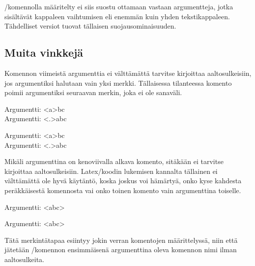 \-/komennolla määritelty  ei siis suostu ottamaan vastaan argumentteja, jotka
sisältävät kappaleen vaihtumisen eli enemmän kuin yhden tekstikappaleen.
Tähdelliset versiot tuovat tällaisen suo\-jaus\-omi\-nai\-suu\-den.

\subsection{Muita vinkkejä}
\label{luku:komennot-lisä}

Komennon viimeistä argumenttia ei välttämättä tarvitse kirjoittaa
aaltosulkeisiin, jos argumentiksi halutaan vain yksi merkki. Tällaisessa
tilanteessa komento poimii argumentiksi seuraavan merkin, joka ei ole
sanaväli.

\pagebreak[3]

\begin{koodilohkosis}
  \newcommand{\x}[1]{Argumentti: <#1>}
  \x abc \\
  \x.abc
\end{koodilohkosis}

\begin{tulossis}
  Argumentti: <a>bc \\
  Argumentti: <.>abc
\end{tulossis}

Mikäli argumenttina on kenoviivalla alkava komento, sitäkään ei tarvitse
kirjoittaa aaltosulkeisiin. Latex\-/koodin lukemisen kannalta tällainen
ei välttämättä ole hyvä käytäntö, koska joskus voi hämärtyä, onko kyse
kahdesta peräkkäisestä komennosta vai onko toinen komento vain
argumenttina toiselle.

\pagebreak[3]

\begin{koodilohkosis}
  \newcommand{\x}[1]{Argumentti: <#1>}
  \newcommand{\yyy}{abc}
  \x\yyy
\end{koodilohkosis}

\begin{tulossis}
  Argumentti: <abc>
\end{tulossis}

Tätä merkintätapaa esiintyy jokin verran komentojen määrittelyssä, niin
että jätetään \-/komennon ensimmäisenä
argumenttina oleva komennon nimi ilman aaltosulkeita.

\begin{koodilohkosis}
  \newcommand\yyy{abc}
\end{koodilohkosis}


